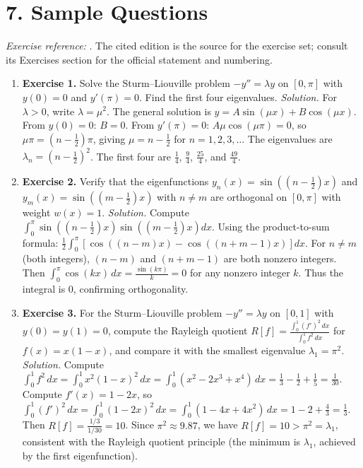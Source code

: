 \section*{7. Sample Questions}
\emph{Exercise reference:} \cite{sturm_ref1}. The cited edition is the source for the exercise set; consult its Exercises section for the official statement and numbering.
\begin{enumerate}[leftmargin=*,itemsep=0.9em]
\item \textbf{Exercise 1.} Solve the Sturm--Liouville problem $-y'' = \lambda y$ on $[0, \pi]$ with $y(0) = 0$ and $y'(\pi) = 0$. Find the first four eigenvalues. \emph{Solution.} For $\lambda > 0$, write $\lambda = \mu^2$. The general solution is $y = A\sin(\mu x) + B\cos(\mu x)$. From $y(0) = 0$: $B = 0$. From $y'(\pi) = 0$: $A\mu\cos(\mu\pi) = 0$, so $\mu\pi = (n - \frac{1}{2})\pi$, giving $\mu = n - \frac{1}{2}$ for $n = 1, 2, 3, \ldots$ The eigenvalues are $\lambda_n = (n - \frac{1}{2})^2$. The first four are $\frac{1}{4}$, $\frac{9}{4}$, $\frac{25}{4}$, and $\frac{49}{4}$.

\item \textbf{Exercise 2.} Verify that the eigenfunctions $y_n(x) = \sin\!\left((n - \frac{1}{2})x\right)$ and $y_m(x) = \sin\!\left((m - \frac{1}{2})x\right)$ with $n \neq m$ are orthogonal on $[0, \pi]$ with weight $w(x) = 1$. \emph{Solution.} Compute $\int_0^\pi \sin\!\left((n - \frac{1}{2})x\right)\sin\!\left((m - \frac{1}{2})x\right)dx$. Using the product-to-sum formula: $\frac{1}{2}\int_0^\pi \left[\cos\!\left((n - m)x\right) - \cos\!\left((n + m - 1)x\right)\right]dx$. For $n \neq m$ (both integers), $(n - m)$ and $(n + m - 1)$ are both nonzero integers. Then $\int_0^\pi \cos(kx)\,dx = \frac{\sin(k\pi)}{k} = 0$ for any nonzero integer $k$. Thus the integral is $0$, confirming orthogonality.

\item \textbf{Exercise 3.} For the Sturm--Liouville problem $-y'' = \lambda y$ on $[0,1]$ with $y(0) = y(1) = 0$, compute the Rayleigh quotient $R[f] = \frac{\int_0^1 (f')^2\,dx}{\int_0^1 f^2\,dx}$ for $f(x) = x(1-x)$, and compare it with the smallest eigenvalue $\lambda_1 = \pi^2$. \emph{Solution.} Compute $\int_0^1 f^2\,dx = \int_0^1 x^2(1-x)^2\,dx = \int_0^1 (x^2 - 2x^3 + x^4)\,dx = \frac{1}{3} - \frac{1}{2} + \frac{1}{5} = \frac{1}{30}$. Compute $f'(x) = 1 - 2x$, so $\int_0^1 (f')^2\,dx = \int_0^1 (1-2x)^2\,dx = \int_0^1 (1 - 4x + 4x^2)\,dx = 1 - 2 + \frac{4}{3} = \frac{1}{3}$. Then $R[f] = \frac{1/3}{1/30} = 10$. Since $\pi^2 \approx 9.87$, we have $R[f] = 10 > \pi^2 = \lambda_1$, consistent with the Rayleigh quotient principle (the minimum is $\lambda_1$, achieved by the first eigenfunction).


\end{enumerate}
